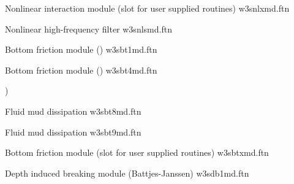 \vspace{\baselineskip}
\noindent
Nonlinear interaction module (slot for user supplied routines) \hfill {\file
w3snlxmd.ftn}

\begin{flisti}
\end{flisti}

\vspace{\baselineskip}
\noindent
Nonlinear high-frequency filter \hfill {\file w3snlsmd.ftn}

\begin{flisti}
\end{flisti}

\noindent
Bottom friction module (\js) \hfill {\file w3sbt1md.ftn}

\begin{flisti}
\end{flisti}

\noindent
Bottom friction module (\showex) \hfill {\file w3sbt4md.ftn}

\begin{flisti}
)
\end{flisti}

\noindent
Fluid mud dissipation \citep{art:DL78}  \hfill {\file w3sbt8md.ftn}

\begin{flisti}
\end{flisti}

\pb \noindent
Fluid mud dissipation \citep{art:Ng00}  \hfill {\file w3sbt9md.ftn}

\begin{flisti}
\end{flisti}

\noindent
Bottom friction module (slot for user supplied routines) \hfill {\file
w3sbtxmd.ftn}

\begin{flisti}
\end{flisti}

\noindent
Depth induced breaking module (Battjes-Janssen) \hfill {\file w3sdb1md.ftn}

